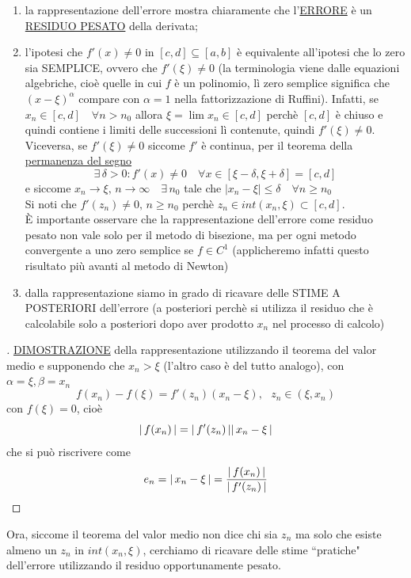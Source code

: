 \begin{enumerate}
    \item la rappresentazione dell'errore mostra chiaramente che l'\uline{ERRORE} è un \uline{RESIDUO PESATO} della derivata;
    \item l'ipotesi che $f'(x)\ne0$ in $[c,d]\subseteq [a,b]$ è equivalente all'ipotesi che lo zero sia SEMPLICE, ovvero che $f'(\xi)\ne 0$ (la terminologia viene dalle equazioni algebriche, cioè quelle in cui $f$ è un polinomio, lì zero semplice significa che $(x-\xi)^{\alpha}$ compare con $\alpha =1$ nella fattorizzazione di Ruffini). Infatti, se $x_n\in [c,d]\quad \forall n>n_0$ allora $\xi=\lim x_n\in [c,d]$ perchè $[c,d]$ è chiuso e quindi contiene i limiti delle successioni lì contenute, quindi $f'(\xi)\ne 0$.
    Viceversa, se $f'(\xi)\ne 0$ siccome $f'$ è continua, per il teorema della \uline{permanenza del segno}
    \[\exists\, \delta>0 : f'(x)\ne 0\quad \forall x \in [\xi - \delta, \xi + \delta] = [c,d]\]
    e siccome $x_n \to \xi,\,n \to \infty\quad \exists \,n_0$ tale che $|x_n-\xi|\le \delta \quad \forall n \ge n_0$\\
    Si noti che $f'(z_n)\ne 0,\, n\ge n_0$ perchè $z_n \in int(x_n,\xi)\subset[c,d]$.\\
    È importante osservare che la rappresentazione dell'errore come residuo pesato non vale solo per il metodo di bisezione, ma per ogni metodo convergente a uno zero semplice se $f\in C^1$ (applicheremo infatti questo risultato più avanti al metodo di Newton)
    \item dalla rappresentazione siamo in grado di ricavare delle STIME A POSTERIORI dell'errore (a posteriori perchè si utilizza il residuo che è calcolabile solo a posteriori dopo aver prodotto $x_n$ nel processo di calcolo)
\end{enumerate}
\begin{proof}[\unskip\nopunct]
\uline{DIMOSTRAZIONE} della rappresentazione utilizzando il teorema del valor medio e supponendo che $x_n>\xi$ (l'altro caso è del tutto analogo), con $\alpha=\xi, \beta=x_n$
\[ f(x_n)-f(\xi) = f'(z_n)(x_n-\xi), \text{ } z_n \in (\xi,x_n)\]
con $f(\xi)=0$, cioè
\[ \lvert\,f(x_n)\,\rvert = \lvert\,f'(z_n)\,\rvert\lvert\,x_n-\xi\,\rvert \]
che si può riscrivere come
\[ e_n = \lvert\,x_n-\xi\,\rvert = \frac{\lvert\,f(x_n)\,\rvert}{\lvert\,f'(z_n)\,\rvert} \]
\end{proof}

Ora, siccome il teorema del valor medio non dice chi sia $z_n$ ma solo che esiste almeno un $z_n$ in $int(x_n,\xi)$, cerchiamo di ricavare delle stime ``pratiche" dell'errore utilizzando il residuo opportunamente pesato.

